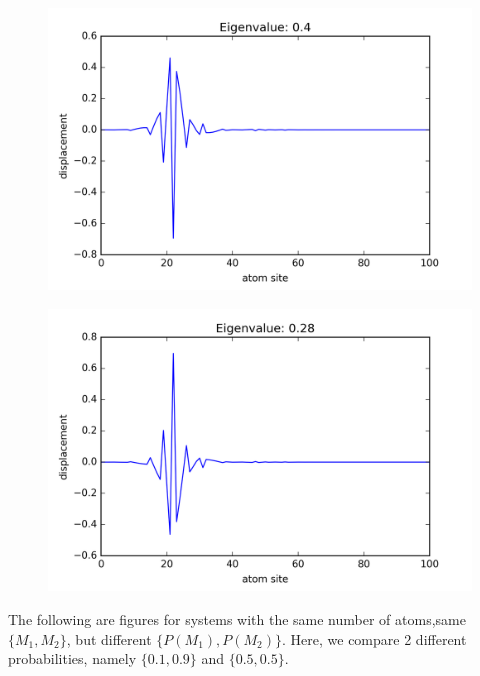 \begin{figure}[!htbh]
\centering
\begin{minipage}{.45\textwidth}
  \centering
  \includegraphics[width=1.1\linewidth]{Harmonic_mass_ratio/normal_Prob_0_5N_103m_20_0p_51th.png}
  \label{fig:mass ratio 20.0 51st}
\end{minipage}\qquad
\begin{minipage}{.45\textwidth}
  \centering
  \includegraphics[width=1.1\linewidth]{Harmonic_mass_ratio/normal_Prob_0_5N_103m_40_0p_51th.png}
  \label{fig:mass ratio 40.0 51st}
\end{minipage}
\end{figure}

\newpage
The following are figures for systems with the same number of atoms,same $\{M_1, M_2\}$, but different $\{P(M_1), P(M_2)\}$. Here, we compare 2 different probabilities, namely $\{0.1, 0.9\}$ and $\{0.5, 0.5\}$. 

